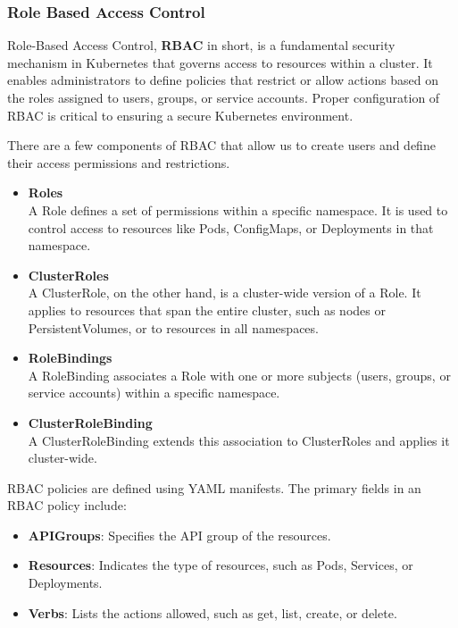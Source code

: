 \subsubsection*{Role Based Access Control}

Role-Based Access Control, \textbf{RBAC} in short, is a fundamental security mechanism in Kubernetes that governs access to resources within a cluster. It enables administrators to define policies that restrict or allow actions based on the roles assigned to users, groups, or service accounts. Proper configuration of RBAC is critical to ensuring a secure Kubernetes environment.

There are a few components of RBAC that allow us to create users and define their access permissions and restrictions.

\begin{itemize}
    \item \textbf{Roles} \\
    A Role defines a set of permissions within a specific namespace. It is used to control access to resources like Pods, ConfigMaps, or Deployments in that namespace.
    \item \textbf{ClusterRoles} \\
    A ClusterRole, on the other hand, is a cluster-wide version of a Role. It applies to resources that span the entire cluster, such as nodes or PersistentVolumes, or to resources in all namespaces.
    \item \textbf{RoleBindings} \\
    A RoleBinding associates a Role with one or more subjects (users, groups, or service accounts) within a specific namespace.
    \item \textbf{ClusterRoleBinding} \\
    A ClusterRoleBinding extends this association to ClusterRoles and applies it cluster-wide.
\end{itemize}

RBAC policies are defined using YAML manifests. The primary fields in an RBAC policy include:

\begin{itemize}
    \item \textbf{APIGroups}: Specifies the API group of the resources.
    \item \textbf{Resources}: Indicates the type of resources, such as Pods, Services, or Deployments.
    \item \textbf{Verbs}: Lists the actions allowed, such as get, list, create, or delete.
\end{itemize}

